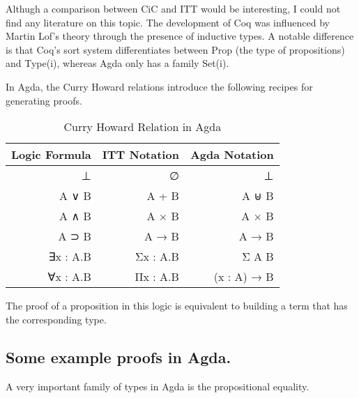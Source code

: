 \documentclass[12pt,twoside,notitlepage]{report}
\newcommand{\Conid}[1]{\mathit{#1}}
\newcommand{\Varid}[1]{\mathit{#1}}
\newcommand{\anonymous}{\kern0.06em \_}
\def\resethooks{%
  \global\let\SaveRestoreHook\empty
  \global\let\ColumnHook\empty}
\newcommand{\hsindent}[1]{\quad}%
\let\hspre\empty
\let\hspost\empty
\begin{document}
Althugh a comparison between CiC and ITT would be interesting, I could not find any literature on this topic. The development of Coq was influenced by Martin Lof’s theory through the presence of inductive types\cite{coq_inductive}. A notable difference is that Coq’s sort system differentiates between Prop (the type of propositions) and Type(i), whereas Agda only has a family Set(i).

In Agda, the Curry Howard relations introduce the following recipes for generating proofs.

\begin{table}[h!]
\centering
	\begin{tabular}{r r r} 
	\hline 
	Logic Formula & ITT Notation & Agda Notation \\
	\hline
	⊥  & ∅  & ⊥ \\
	A ∨ B & A + B &   A ⊎ B \\
	A ∧ B & A × B &   A × B \\
	A ⊃ B & A → B &   A → B \\ 
	∃x : A.B & Σx : A.B & Σ A B \\
	∀x : A.B & Πx : A.B & (x : A) →  B\\ 
	\hline
	\end{tabular}
\caption{Curry Howard Relation in Agda}
\end{table} 

The proof of a proposition in this logic is equivalent to building a term that has the corresponding type.

\subsection{Some example proofs in Agda.}

A very important family of types in Agda is the propositional equality. 

\resethooks
\end{document}
